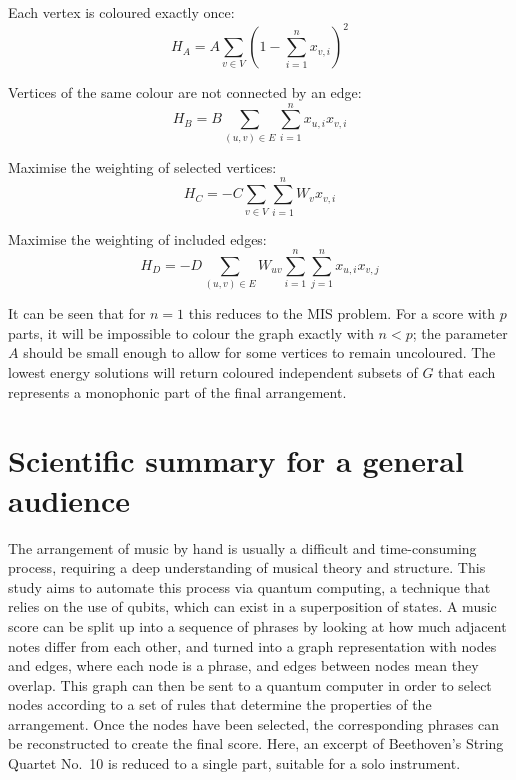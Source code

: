 \documentclass[12pt]{article}
\begin{document}
Each vertex is coloured exactly once:
\begin{equation*}
    H_A = A\sum_{v \in V}\left(1-\sum_{i=1}^{n} x_{v,i}\right)^2
\end{equation*}

Vertices of the same colour are not connected by an edge:
\begin{equation*}
    H_B = B\sum_{(u,v) \in E}\sum_{i=1}^n x_{u,i}x_{v,i}
\end{equation*}

Maximise the weighting of selected vertices:
\begin{equation*}
    H_C = -C\sum_{v \in V}\sum_{i=1}^n W_vx_{v,i}
\end{equation*}

Maximise the weighting of included edges:
\begin{equation*}
    H_D = -D\sum_{(u,v)\in E}W_{uv}\sum_{i=1}^n\sum_{j=1}^n x_{u,i}x_{v,j}
\end{equation*}

It can be seen that for $n=1$ this reduces to the MIS problem. For a score with $p$ parts, it will be impossible to colour the graph exactly with $n<p$; the parameter $A$ should be small enough to allow for some vertices to remain uncoloured. The lowest energy solutions will return coloured independent subsets of $G$ that each represents a monophonic part of the final arrangement.

\clearpage

\section*{Scientific summary for a general audience} %

The arrangement of music by hand is usually a difficult and time-consuming process, requiring a deep understanding of musical theory and structure. This study aims to automate this process via quantum computing, a technique that relies on the use of qubits, which can exist in a superposition of states. A music score can be split up into a sequence of phrases by looking at how much adjacent notes differ from each other, and turned into a graph representation with nodes and edges, where each node is a phrase, and edges between nodes mean they overlap. This graph can then be sent to a quantum computer in order to select nodes according to a set of rules that determine the properties of the arrangement. Once the nodes have been selected, the corresponding phrases can be reconstructed to create the final score. Here, an excerpt of Beethoven's String Quartet No.\ 10 is reduced to a single part, suitable for a solo instrument.
\end{document}
